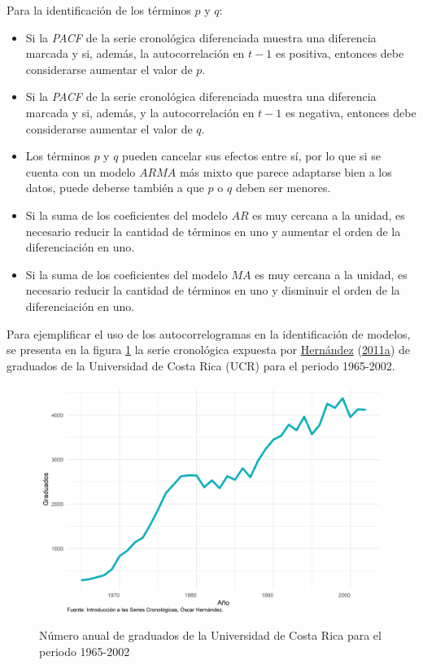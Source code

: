 \documentclass[
]{article}
\providecommand{\tightlist}{%
  \setlength{\itemsep}{0pt}\setlength{\parskip}{0pt}}
\begin{document}
Para la identificación de los términos \(p\) y \(q\):

\begin{itemize}
\tightlist
\item
  Si la \emph{PACF} de la serie cronológica diferenciada muestra una
  diferencia marcada y si, además, la autocorrelación en \(t-1\) es
  positiva, entonces debe considerarse aumentar el valor de \(p\).
\item
  Si la \emph{PACF} de la serie cronológica diferenciada muestra una
  diferencia marcada y si, además, y la autocorrelación en \(t-1\) es
  negativa, entonces debe considerarse aumentar el valor de \(q\).
\item
  Los términos \(p\) y \(q\) pueden cancelar sus efectos entre sí, por
  lo que si se cuenta con un modelo \(ARMA\) más mixto que parece
  adaptarse bien a los datos, puede deberse también a que \(p\) o \(q\)
  deben ser menores.
\item
  Si la suma de los coeficientes del modelo \(AR\) es muy cercana a la
  unidad, es necesario reducir la cantidad de términos en uno y aumentar
  el orden de la diferenciación en uno.
\item
  Si la suma de los coeficientes del modelo \(MA\) es muy cercana a la
  unidad, es necesario reducir la cantidad de términos en uno y
  disminuir el orden de la diferenciación en uno.
\end{itemize}

Para ejemplificar el uso de los autocorrelogramas en la identificación
de modelos, se presenta en la figura \ref{fig:ejemplo_ucr} la serie
cronológica expuesta por \protect\hyperlink{ref-oscarh-1}{Hernández}
(\protect\hyperlink{ref-oscarh-1}{2011a}) de graduados de la Universidad
de Costa Rica (UCR) para el periodo 1965-2002.

\begin{figure}[!h]
\includegraphics[width=1\linewidth,height=1\textheight]{Tesis_files/figure-latex/ejemplo_ucr-1} \caption{Número anual de graduados de la Universidad de Costa Rica para el periodo 1965-2002}\label{fig:ejemplo_ucr}
\end{figure}
\end{document}
